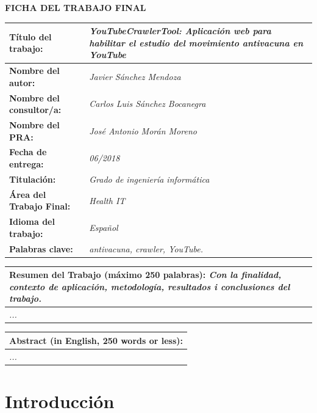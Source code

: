 \documentclass[11pt,a4paper]{article}
\begin{document}
\begin{center}
\textbf{FICHA DEL TRABAJO FINAL}
\end{center}
\begin{tabularx}{\textwidth}{|X|X|}
\hline 
\textbf{Título del trabajo:} &\cellcolor{gray!25} \textit{YouTubeCrawlerTool: Aplicación web para habilitar el estudio del movimiento antivacuna en YouTube} \\ 
\hline 
\textbf{Nombre del autor:} &\cellcolor{gray!25} \textit{Javier Sánchez Mendoza} \\ 
\hline 
\textbf{Nombre del consultor/a:} &\cellcolor{gray!25} \textit{Carlos Luis Sánchez Bocanegra} \\ 
\hline 
\textbf{Nombre del PRA:} &\cellcolor{gray!25} \textit{José Antonio Morán Moreno} \\ 
\hline 
\textbf{Fecha de entrega:} &\cellcolor{gray!25} \textit{06/2018} \\ 
\hline 
\textbf{Titulación:} &\cellcolor{gray!25} \textit{Grado de ingeniería informática} \\ 
\hline 
\textbf{Área del Trabajo Final:} &\cellcolor{gray!25} \textit{Health IT} \\ 
\hline 
\textbf{Idioma del trabajo:} &\cellcolor{gray!25} \textit{Español} \\ 
\hline 
\textbf{Palabras clave:} &\cellcolor{gray!25} \textit{antivacuna, crawler, YouTube.} \\ 
\hline
\end{tabularx} 
\begin{tabularx}{\textwidth}{|X|}
\textbf{Resumen del Trabajo (máximo 250 palabras):} \textit{Con la finalidad, contexto de aplicación, metodología, resultados i conclusiones del trabajo.} \\ 
\hline 
\cellcolor{gray!25} \textit{...} \\
\hline 
\end{tabularx} 
\newpage 


\begin{tabularx}{\textwidth}{|X|}
\hline 
\textbf{Abstract (in English, 250 words or less):} \\ 
\hline 
\cellcolor{gray!25} \textit{...} \\
\hline 
\end{tabularx} 
\newpage 


\tableofcontents
\newpage


\listoffigures
\newpage


\section{Introducción}
\bigskip 
\end{document}
